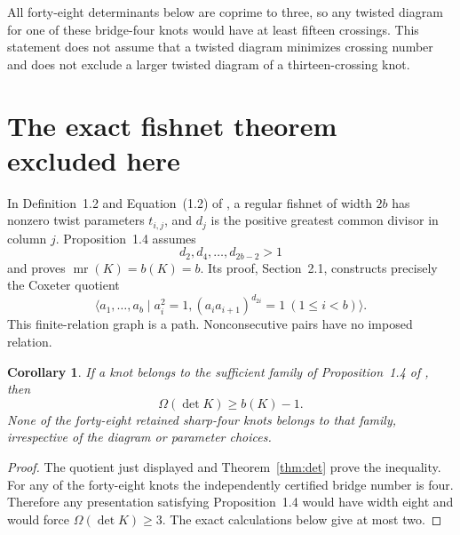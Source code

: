 \documentclass[11pt]{article}
\newtheorem{corollary}[theorem]{Corollary}
\newcommand{\mr}{\operatorname{mr}}
\begin{document}
All forty-eight determinants below are coprime to three, so any
twisted diagram for one of these bridge-four knots would have at
least fifteen crossings.  This statement does not assume that a
twisted diagram minimizes crossing number and does not exclude
a larger twisted diagram of a thirteen-crossing knot.

\section{The exact fishnet theorem excluded here}

In Definition~1.2 and Equation~(1.2) of \cite{bkp}, a regular fishnet
of width $2b$ has nonzero twist parameters $t_{i,j}$, and $d_j$ is
the positive greatest common divisor in column $j$.
Proposition~1.4 assumes
\[
                         d_2,d_4,\ldots,d_{2b-2}>1
\]
and proves $\mr(K)=b(K)=b$.  Its proof, Section~2.1, constructs
precisely the Coxeter quotient
\[
 \langle a_1,\ldots,a_b\mid a_i^2=1,
              (a_i a_{i+1})^{d_{2i}}=1\ (1\le i<b)\rangle.
\]
This finite-relation graph is a path.  Nonconsecutive pairs have
no imposed relation.

\begin{corollary}\label{cor:fishnet}
If a knot belongs to the sufficient family of Proposition~1.4 of
\cite{bkp}, then
\[
                     \Omega(\det K)\ge b(K)-1.
\]
None of the forty-eight retained sharp-four knots belongs to
that family, irrespective of the diagram or parameter choices.
\end{corollary}
\begin{proof}
The quotient just displayed and Theorem~\ref{thm:det} prove the
inequality.  For any of the forty-eight knots the independently
certified bridge number is four.  Therefore any presentation
satisfying Proposition~1.4 would have width eight and would force
$\Omega(\det K)\ge3$.  The exact calculations below give at most two.
\end{proof}
\end{document}
